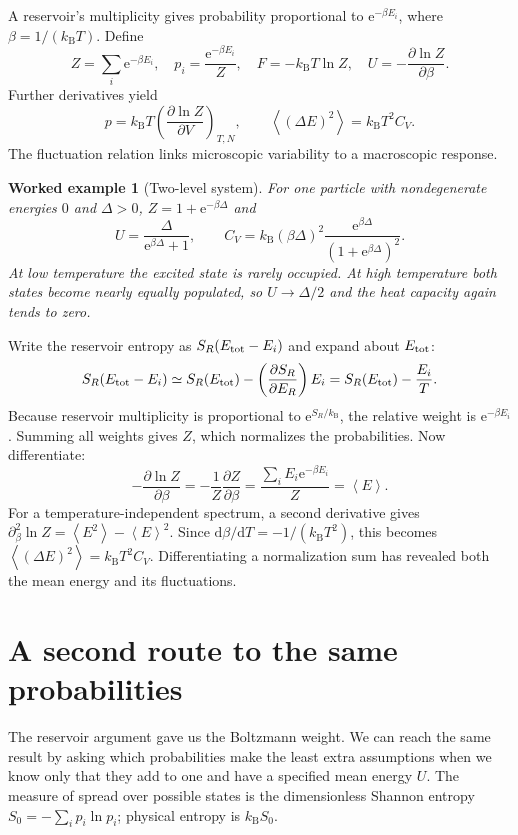 \documentclass[11pt,oneside]{book}
\newcommand{\dd}{\mathrm{d}}
\newcommand{\ee}{\mathrm{e}}
\newcommand{\avg}[1]{\left\langle #1\right\rangle}
\newcommand{\pd}[2]{\frac{\partial #1}{\partial #2}}
\newcommand{\kb}{k_{\mathrm B}}
\theoremstyle{reviewstyle}
\newtheorem{example}{Worked example}[chapter]
\begin{document}
A reservoir's multiplicity gives probability proportional to $\ee^{-\beta E_i}$, where $\beta=1/(\kb T)$. Define
\begin{equation}
Z=\sum_i\ee^{-\beta E_i},\quad p_i=\frac{\ee^{-\beta E_i}}Z,\quad
F=-\kb T\ln Z,\quad U=-\pd{\ln Z}{\beta}.
\end{equation}
Further derivatives yield
\begin{equation}
p=\kb T\left(\pd{\ln Z}{V}\right)_{T,N},\qquad
\avg{(\Delta E)^2}=\kb T^2C_V.
\end{equation}
The fluctuation relation links microscopic variability to a macroscopic response.
\begin{example}[Two-level system]
For one particle with nondegenerate energies $0$ and $\Delta>0$, $Z=1+\ee^{-\beta\Delta}$ and
\begin{equation}
U=\frac{\Delta}{\ee^{\beta\Delta}+1},\qquad
C_V=\kb(\beta\Delta)^2\frac{\ee^{\beta\Delta}}{(1+\ee^{\beta\Delta})^2}.
\end{equation}
At low temperature the excited state is rarely occupied. At high temperature both states become nearly equally populated, so $U\to\Delta/2$ and the heat capacity again tends to zero.
\end{example}

Write the reservoir entropy as $S_R(E_{\rm tot}-E_i)$ and expand about $E_{\rm tot}$:
\begin{equation}
S_R(E_{\rm tot}-E_i)\simeq S_R(E_{\rm tot})-
\left(\pd{S_R}{E_R}\right)E_i
=S_R(E_{\rm tot})-\frac{E_i}{T}.
\end{equation}
Because reservoir multiplicity is proportional to $\ee^{S_R/\kb}$, the relative weight is $\ee^{-\beta E_i}$. Summing all weights gives $Z$, which normalizes the probabilities. Now differentiate:
\begin{equation}
-\pd{\ln Z}{\beta}=-\frac1Z\pd Z\beta
=\frac{\sum_iE_i\ee^{-\beta E_i}}Z=\avg E.
\end{equation}
For a temperature-independent spectrum, a second derivative gives $\partial_\beta^2\ln Z=\avg{E^2}-\avg E^2$. Since $\dd\beta/\dd T=-1/(\kb T^2)$, this becomes $\avg{(\Delta E)^2}=\kb T^2C_V$. Differentiating a normalization sum has revealed both the mean energy and its fluctuations.

\section{A second route to the same probabilities}
The reservoir argument gave us the Boltzmann weight. We can reach the same result by asking which probabilities make the least extra assumptions when we know only that they add to one and have a specified mean energy $U$. The measure of spread over possible states is the dimensionless Shannon entropy $S_0=-\sum_i p_i\ln p_i$; physical entropy is $\kb S_0$.
\end{document}
